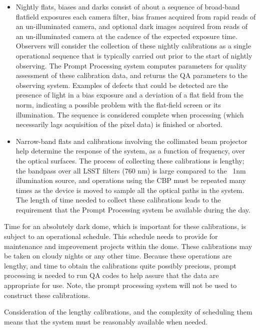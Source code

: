 \begin{itemize}

\item Nightly flats, biases and darks consist of about a sequence of  broad-band
flatfield exposures each camera filter, bias frames acquired from
rapid reads of an un-illuminated camera, and optional dark images
acquired from reads of an un-illuminated camera at the cadence of the
expected exposure time.  Observers will consider the collection of
these nightly calibrations as a single operational sequence that is
typically carried out prior to the start of nightly observing.  The
Prompt Processing system computes parameters for quality assessment of
these calibration data, and returns the QA parameters to the observing
system.  Examples of defects that could be detected are the presence
of light in a bias exposure and a deviation of a flat field from the
norm, indicating a possible problem with the flat-field screen or its
illumination.  The sequence is considered complete when processing
(which necessarily lags acquisition of the pixel data) is finished or
aborted.

\item Narrow-band flats and calibrations involving the collimated beam
projector help determine the response of the system, as a function of
frequency, over the optical surfaces.  The process of collecting these
calibrations is lengthy; the bandpass over all LSST filters (760 nm)
is large compared to the ~1nm illumination source, and operations
using the CBP must be repeated many times as the device is moved to
sample all the optical paths in the system.  The length of time needed
to collect these calibrations leads to the requirement that the Prompt
Processing system be available during the day. \\

\end{itemize}

Time for an absolutely dark dome, which is important for these
calibrations, is subject to an operational schedule.  This schedule
needs to provide for maintenance and improvement projects within the
dome.  These calibrations may be taken on cloudy nights or any other
time.  Because these operations are lengthy, and time to obtain the
calibrations quite possibly precious, prompt processing is needed to
run QA codes to help assure that the data are appropriate for
use. Note, the prompt processing system will not be used to construct
these calibrations.

Consideration of the lengthy calibrations, and the complexity of
scheduling them means that the system must be reasonably available
when needed. 


